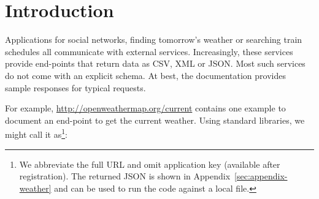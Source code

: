 \documentclass[10pt]{sigplanconf}
\begin{document}
%
%

\section{Introduction}
\label{sec:introduction}

Applications for social networks, finding tomorrow's weather or searching train schedules
all communicate with external services. Increasingly, these services provide end-points that return
data as CSV, XML or JSON. Most such services do not come with an explicit schema. At best, the
documentation provides sample responses for typical requests.

For example, \url{http://openweathermap.org/current} contains one example to document an end-point
to get the current weather. Using standard libraries, we might call it as\footnote{We abbreviate
the full URL and omit application key (available after registration). The returned JSON is shown
in Appendix~\ref{sec:appendix-weather} and can be used to run the code against a local file.}:
\end{document}

